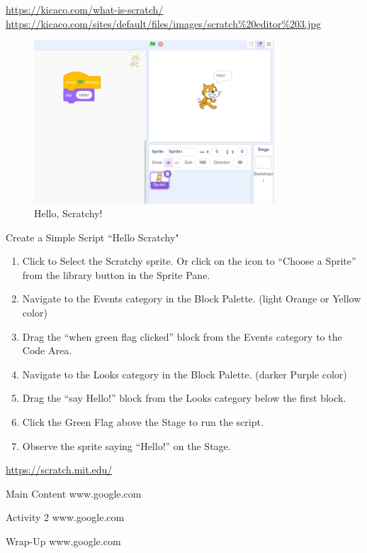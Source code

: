 \documentclass[main.tex]{subfiles}
\begin{document}
{\url{https://kicaco.com/what-is-scratch/} \\ \url{https://kicaco.com/sites/default/files/images/scratch\%20editor\%203.jpg}}

\pagebreak[3]


\begin{figure}[h]
  \centering
  \includegraphics[width=0.8\textwidth, frame]{../images/hello}
  \caption{Hello, Scratchy!}
  \label{fig:scratch_hello}
\end{figure}

{Create a Simple Script ``Hello Scratchy"}
{


  \begin{enumerate}[label=\textbf{\arabic*.}, leftmargin=2em]
    \item Click to Select the Scratchy sprite. Or click on the icon to ``Choose a Sprite'' from the library button in the Sprite Pane.
    \item Navigate to the Events category in the Block Palette. (light Orange or Yellow color)
    \item Drag the ``when green flag clicked'' block from the Events category to the Code Area.
    \item Navigate to the Looks category in the Block Palette. (darker Purple color)
    \item Drag the ``say Hello!'' block from the Looks category below the first block.
    \item Click the Green Flag above the Stage to run the script.
    \item Observe the sprite saying ``Hello!'' on the Stage.
  \end{enumerate}
}
{\url{https://scratch.mit.edu/}}

\pagebreak[3]


{Main Content}
{\Blindtext [2] [1]}
{www.google.com}

\pagebreak[3]


{Activity 2}
{\Blindtext [1] [1]}
{www.google.com}

\pagebreak[3]


{Wrap-Up}
{\Blindtext [1] [1]}
{www.google.com}
\end{document}

